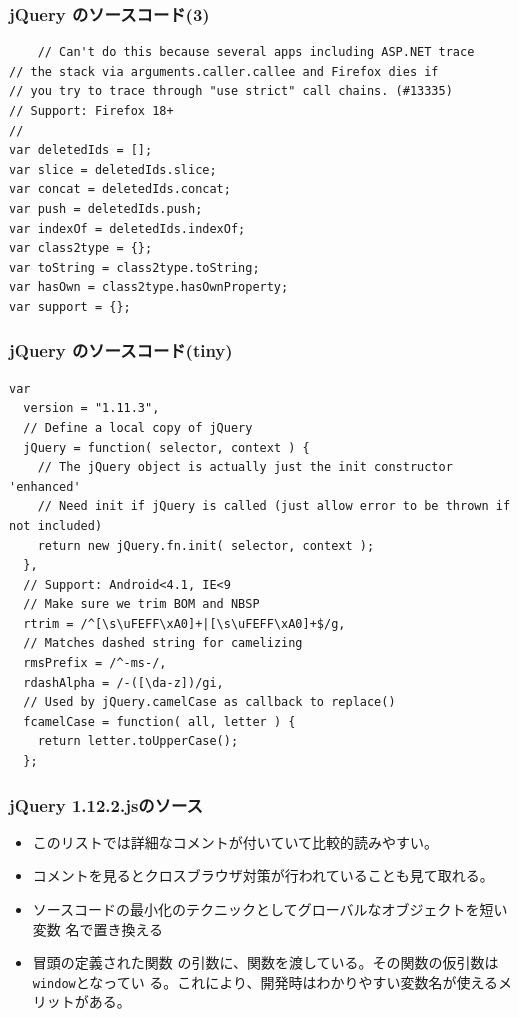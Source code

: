 \documentclass[dvipsk]{beamer}
\begin{document}
\begin{frame}[containsverbatim]
 \frametitle{jQuery のソースコード(3)}
 {\footnotesize
\begin{verbatim}
	// Can't do this because several apps including ASP.NET trace
// the stack via arguments.caller.callee and Firefox dies if
// you try to trace through "use strict" call chains. (#13335)
// Support: Firefox 18+
//
var deletedIds = [];
var slice = deletedIds.slice;
var concat = deletedIds.concat;
var push = deletedIds.push;
var indexOf = deletedIds.indexOf;
var class2type = {};
var toString = class2type.toString;
var hasOwn = class2type.hasOwnProperty;
var support = {};
\end{verbatim}
 }
\end{frame}
\begin{frame}[containsverbatim]
 \frametitle{jQuery のソースコード(tiny)}
 {\footnotesize
\begin{verbatim}
var
  version = "1.11.3",
  // Define a local copy of jQuery
  jQuery = function( selector, context ) {
    // The jQuery object is actually just the init constructor 'enhanced'
    // Need init if jQuery is called (just allow error to be thrown if not included)
    return new jQuery.fn.init( selector, context );
  },
  // Support: Android<4.1, IE<9
  // Make sure we trim BOM and NBSP
  rtrim = /^[\s\uFEFF\xA0]+|[\s\uFEFF\xA0]+$/g,
  // Matches dashed string for camelizing
  rmsPrefix = /^-ms-/,
  rdashAlpha = /-([\da-z])/gi,
  // Used by jQuery.camelCase as callback to replace()
  fcamelCase = function( all, letter ) {
    return letter.toUpperCase();
  };
\end{verbatim}
 }
\end{frame}
\begin{frame}[containsverbatim]
 \frametitle{jQuery 1.12.2.jsのソース}
 \begin{itemize}
  \item このリストでは詳細なコメントが付いていて比較的読みやすい。
  \item コメントを見るとクロスブラウザ対策が行われていることも見て取れる。
  \item ソースコードの最小化のテクニックとしてグローバルなオブジェクトを短い変数
名で置き換える
  \item 冒頭の定義された関数
の引数に、関数を渡している。その関数の仮引数は\texttt{window}となってい
る。これにより、開発時はわかりやすい変数名が使えるメリットがある。
 \end{itemize}
\end{frame}
\end{document}
